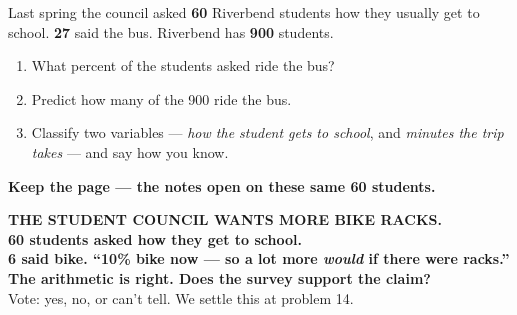 \documentclass[aspectratio=169, 11pt]{beamer}
\begin{document}
\begin{frame}[t, plain]
  \vspace{0.3cm}
  \begin{center}
    \begin{minipage}{0.86\textwidth}
      Last spring the council asked \textbf{60} Riverbend students how they usually get to
      school. \textbf{27} said the bus. Riverbend has \textbf{900} students.
      \begin{enumerate}\setlength{\itemsep}{7pt}
        \item What percent of the students asked ride the bus?
        \item Predict how many of the 900 ride the bus.
        \item Classify two variables --- \emph{how the student gets to school}, and
              \emph{minutes the trip takes} --- and say how you know.
      \end{enumerate}
    \end{minipage}
  \end{center}
  \vspace{0.4cm}
  \begin{center}
    {\color{cerulean}\bfseries Keep the page --- the notes open on these same 60 students.}
  \end{center}
\end{frame}

{
\begin{frame}[plain]
  \vspace{1.2cm}
  \begin{center}
    {\color{frostmid}\bfseries\small THE STUDENT COUNCIL WANTS MORE BIKE RACKS.}\\[0.7cm]
    {\color{white}\bfseries\Large 60 students asked how they get to school. \\[0.3cm]
     6 said bike. ``10\% bike now --- so a lot more \emph{would} if there were racks.''}\\[0.8cm]
    {\color{goldacc}\bfseries\large The arithmetic is right. Does the survey support the claim?}\\[0.4cm]
    {\color{frostmid}\small Vote: yes, no, or can't tell. We settle this at problem 14.}
  \end{center}
\end{frame}
}
\end{document}
